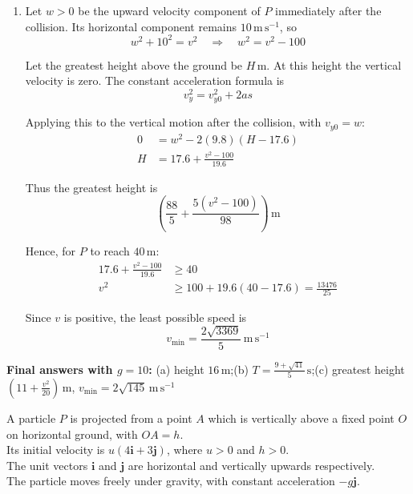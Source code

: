 \documentclass[leqno]{article}
\begin{document}
\begin{enumerate}[
  label=\textbf{\arabic*.},
  leftmargin=*,
  topsep=0pt,
  partopsep=0pt,
  parsep=0pt
]
\begin{djsSolution}
\begin{enumerate}[label=\textbf{(\alph*)}, start=1]
Therefore the required root is
\[
T=\frac{86+2\sqrt{869}}{49}\,\mathrm{s}
\]

\item Let \(w>0\) be the upward velocity component of \(P\) immediately after the collision. Its horizontal component remains \(10\,\mathrm{m\,s^{-1}}\), so
\[
w^2+10^2=v^2\quad\Longrightarrow\quad w^2=v^2-100
\]

Let the greatest height above the ground be \(H\,\mathrm{m}\). At this height the vertical velocity is zero. The constant acceleration formula is
\[
v_y^2=v_{y0}^2+2as
\]

Applying this to the vertical motion after the collision, with \(v_{y0}=w\):
\begin{align*}
0&=w^2-2(9.8)(H-17.6) \\
H&=17.6+\frac{v^2-100}{19.6}
\end{align*}

Thus the greatest height is
\[
\left(\frac{88}{5}+\frac{5(v^2-100)}{98}\right)\,\mathrm{m}
\]

Hence, for \(P\) to reach \(40\,\mathrm{m}\):
\begin{align*}
17.6+\frac{v^2-100}{19.6}&\geq40 \\
v^2&\geq100+19.6(40-17.6)=\frac{13476}{25}
\end{align*}

Since \(v\) is positive, the least possible speed is
\[
v_{\min}=\frac{2\sqrt{3369}}{5}\,\mathrm{m\,s^{-1}}
\]

\end{enumerate}
\par\medskip\noindent\textbf{Final answers with \(g = 10\):} (a) height \(16\,\mathrm{m}\);\quad (b) \(T=\frac{9+\sqrt{41}}{5}\,\mathrm{s}\);\quad (c) greatest height \(\left(11+\frac{v^2}{20}\right)\,\mathrm{m}\), \(v_{\min}=2\sqrt{145}\,\mathrm{m\,s^{-1}}\)
\end{djsSolution}

\newpage

\questionitem

A particle $P$ is projected from a point $A$ which is vertically above a fixed point $O$ on horizontal ground, with $OA=h$. \\
Its initial velocity is $u(4\mathbf{i}+3\mathbf{j})$, where $u>0$ and $h>0$. \\
The unit vectors $\mathbf{i}$ and $\mathbf{j}$ are horizontal and vertically upwards respectively. \\
The particle moves freely under gravity, with constant acceleration $-g\mathbf{j}$. \\


\end{enumerate}
\end{document}
